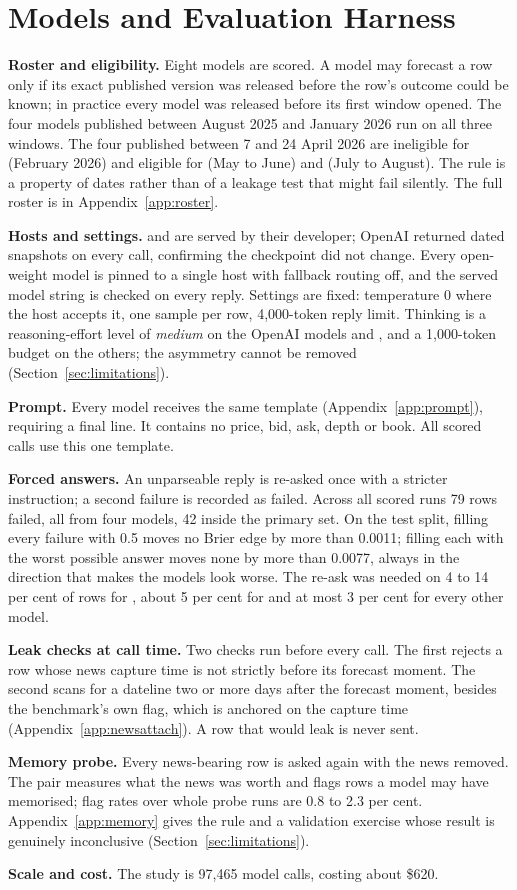 \section{Models and Evaluation Harness}
\label{sec:models}

\textbf{Roster and eligibility.} Eight models are scored. A model may forecast a
row only if its exact published version was released before the row's outcome
could be known; in practice every model was released before its first window
opened. The four models published between August 2025 and January 2026
run on all three windows. The four published between 7 and 24 April 2026 are ineligible for \winA (February 2026) and eligible for \winC (May to June) and \winB (July to August). The rule is a
property of dates rather than of a leakage test that might fail silently. The
full roster is in Appendix~\ref{app:roster}.

\textbf{Hosts and settings.} \mGptFiveTwo and \mGptFiveFive are served by their
developer; OpenAI returned dated snapshots on every call, confirming the
checkpoint did not change. Every open-weight model is pinned to a single host
with fallback routing off, and the served model string is checked on every reply.
Settings are fixed: temperature 0 where the host accepts it, one sample per row, 4{,}000-token reply limit.
Thinking is a reasoning-effort level of \emph{medium} on the OpenAI models and
\mGptOss, and a 1{,}000-token budget on the others; the asymmetry cannot be
removed (Section~\ref{sec:limitations}).

\textbf{Prompt.} Every model receives the same template
(Appendix~\ref{app:prompt}), requiring a final  line. It
contains no price, bid, ask, depth or book. All scored calls use this one template.

\textbf{Forced answers.} An unparseable reply is re-asked once with a stricter
instruction; a second failure is recorded as failed. Across all scored runs 79
rows failed, all from four models, 42 inside the primary set. On the test split, filling every failure with 0.5 moves no Brier edge by more
than 0.0011; filling each with the worst possible answer moves none by more than
0.0077, always in the direction
that makes the models look worse. The re-ask was needed on 4 to 14 per cent of rows for \mKimiKTwoFive, about
5 per cent for \mDeepSeekVFourPro and at most 3 per cent for every other model.

\textbf{Leak checks at call time.} Two checks run before every call. The first
rejects a row whose news capture time is not strictly before its forecast moment.
The second scans for a dateline two or more days after the forecast moment,
besides the benchmark's own flag, which is anchored on the capture time
(Appendix~\ref{app:newsattach}). A row that would leak is never sent.

\textbf{Memory probe.} Every news-bearing row is asked again with the news
removed. The pair measures what the news was worth and flags rows a model may
have memorised; flag rates over whole probe runs are 0.8 to 2.3 per cent. Appendix~\ref{app:memory}
gives the rule and a validation exercise whose result is genuinely inconclusive
(Section~\ref{sec:limitations}).

\textbf{Scale and cost.} The study is 97{,}465 model calls, costing about \$620.
